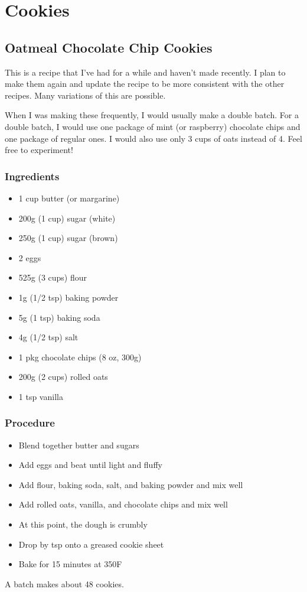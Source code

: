\documentclass[10pt, openany]{book}
\begin{document}
\chapter{Cookies}
\section{Oatmeal Chocolate Chip Cookies}
This is a recipe that I've had for a while and haven't made recently.  I plan to make them again and update the recipe to be more consistent with the other recipes.  Many variations of this are possible.

When I was making these frequently, I would usually make a double batch.  For a double batch, I would use one package of mint (or raspberry) chocolate chips and one package of regular ones.  I would also use only 3 cups of oats instead of 4.  Feel free to experiment!
\subsection{Ingredients}
\begin{itemize}
  \item 1 cup butter (or margarine)
  \item 200g (1 cup) sugar (white)
  \item 250g (1 cup) sugar (brown)
  \item 2 eggs
  \item 525g (3 cups) flour
  \item 1g (1/2 tsp) baking powder
  \item 5g (1 tsp) baking soda
  \item 4g (1/2 tsp) salt
  \item 1 pkg chocolate chips (8 oz, 300g)
  \item 200g (2 cups) rolled oats
  \item 1 tsp vanilla
\end{itemize}
\subsection{Procedure}
\begin{itemize}
  \item Blend together butter and sugars
  \item Add eggs and beat until light and fluffy
  \item Add flour, baking soda, salt, and baking powder and mix well
  \item Add rolled oats, vanilla, and chocolate chips and mix well
  \item At this point, the dough is crumbly
  \item Drop by tsp onto a greased cookie sheet
  \item Bake for 15 minutes at 350\degree{}F
\end{itemize}
A batch makes about 48 cookies.
\end{document}
